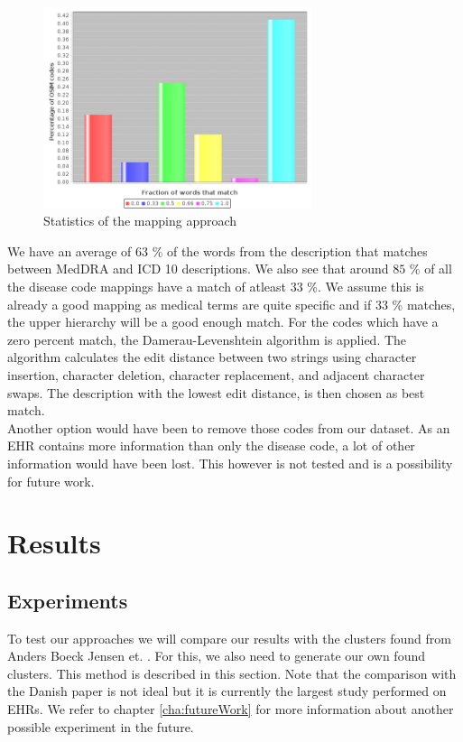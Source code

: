 \begin{figure}[!htb]
	\centering
	\includegraphics[width=0.7\textwidth]{mappingStats.jpeg}
	\caption{Statistics of the mapping approach}
	\label{fig:mappingStats}
\end{figure}

We have an average of $63$ \% of the words from the description that matches between MedDRA and ICD 10 descriptions. We also see that around $85$ \% of all the disease code mappings have a match of atleast $33$ \%. We assume this is already a good mapping as medical terms are quite specific and if $33$ \% matches, the upper hierarchy will be a good enough match. For the codes which have a zero percent match, the Damerau-Levenshtein algorithm \cite{edit:article} is applied. The algorithm calculates the edit distance between two strings using character insertion, character deletion, character replacement, and adjacent character swaps. The description with the lowest edit distance, is then chosen as best match. \\
Another option would have been to remove those codes from our dataset. As an EHR contains more information than only the disease code, a lot of other information would have been lost. This however is not tested and is a possibility for future work. \\

\section{Results}

\subsection{Experiments}

To test our approaches we will compare our results with the clusters found from Anders Boeck Jensen et. \cite{Brunak:article}. For this, we also need to generate our own found clusters. This method is described in this section. Note that the comparison with the Danish paper is not ideal but it is currently the largest study performed on EHRs. We refer to chapter \ref{cha:futureWork} for more information about another possible experiment in the future. \\

